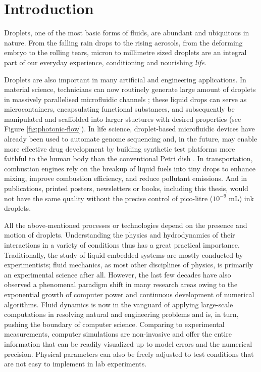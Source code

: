 \graphicspath{{imgs/}}

\chapter{Introduction}

Droplets, one of the most basic forms of fluids, are abundant and ubiquitous in nature.
From the falling rain drops to the rising aerosols, from the deforming embryo to the rolling tears, micron to millimetre sized droplets are an integral part of our everyday experience, conditioning and nourishing \emph{life}.

Droplets are also important in many artificial and engineering applications.
In material science, technicians can now routinely generate large amount of droplets in massively parallelised microfluidic channels \citep{microfluidics}; these liquid drops can serve as microcontainers, encapsulating functional substances, and subsequently be manipulated and scaffolded into larger stuctures with desired properties (see Figure \ref{fig:photonic-flow}).
In life science, droplet-based microfluidic devices have already been used to automate genome sequencing and, in the future, may enable more effective drug development by building synthetic test platforms more faithful to the human body than the conventional Petri dish \citep{Squires_Quakes_2005, organs-on-chips}.
In transportation, combustion engines rely on the breakup of liquid fuels into tiny drops to enhance mixing, improve combustion efficiency, and reduce pollutant emissions.
And in publications, printed posters, newsletters or books, including this thesis, would not have the same quality without the precise control of pico-litre ($10^{-9}$ mL) ink droplets.

All the above-mentioned processes or technologies depend on the presence and motion of droplets.
Understanding the physics and hydrodynamics of their interactions in a variety of conditions thus has a great practical importance.
Traditionally, the study of liquid-embedded systems are mostly conducted by experimentists; fluid mechanics, as most other disciplines of physics, is primarily an experimental science after all.
However, the last few decades have also observed a phenomenal paradigm shift in many research areas owing to the exponential growth of computer power and continuous development of numerical algorithms.
Fluid dynamics is now in the vanguard of applying large-scale computations in resolving natural and engineering problems and is, in turn, pushing the boundary of computer science.
Comparing to experimental measurements, computer simulations are non-invasive and offer the entire information that can be readily visualized up to model errors and the numerical precision.
Physical parameters can also be freely adjusted to test conditions that are not easy to implement in lab experiments.


